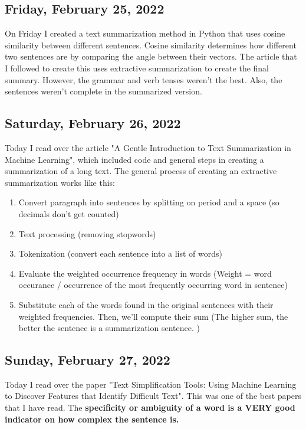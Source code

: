 \documentclass[11pt,letterpaper]{article}
\begin{document}
\subsection{Friday, February 25, 2022}
On Friday I created a text summarization method in Python that uses cosine similarity between different sentences. Cosine similarity determines how different two sentences are by comparing the angle between their vectors. The article that I followed to create this uses extractive summarization to create the final summary. However, the grammar and verb tenses weren't the best. Also, the sentences weren't complete in the summarized version.

\subsection{Saturday, February 26, 2022}
Today I read over the article "A  Gentle Introduction to Text Summarization in Machine Learning", which included code and general steps in creating a summarization of a long text. The general process of creating an extractive summarization works like this:

\begin{enumerate}
    \item Convert paragraph into sentences by splitting on period and a space (so decimals don’t get counted)
    \item Text processing (removing stopwords)
    \item Tokenization (convert each sentence into a list of words)
    \item Evaluate the weighted occurrence frequency in words (Weight = word occurance / occurrence of the most frequently occurring word in sentence)
    \item Substitute each of the words found in the original sentences with their weighted frequencies. Then, we’ll compute their sum (The higher sum, the better the sentence is a summarization sentence. 
)
\end{enumerate}

\subsection{Sunday, February 27, 2022}
Today I read over the paper "Text Simplification Tools: Using Machine Learning to Discover Features that Identify Difficult Text". This was one of the best papers that I have read. The \textbf{specificity or ambiguity of a word is a VERY good indicator on how complex the sentence is.}
\end{document}
